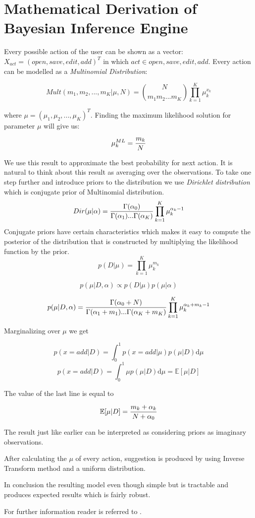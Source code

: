 \section{Mathematical Derivation of Bayesian Inference Engine}
Every possible action of the user can be shown as a vector: $X_{act}=(open, save, edit, add)^T$ in which  $act \in {open, save, edit, add}$. Every action can be modelled as a \textit{Multinomial Distribution}:

\[
Mult(m_1,m_2,...,m_K|\mu,N)={N \choose m_1 m_2 ... m_K}\prod_{k=1}^K \mu_{k}^{x_k}
\]

where $\mu=(\mu_1,\mu_2,...,\mu_K)^T$. Finding the maximum likelihood solution for parameter $\mu$ will give us:

\[
\mu_k^{ML}={m_k \over N} 
\]

We use this result to approximate the best probability for next action. It is natural to think about this result as averaging over the observations.
To take one step further and introduce priors to the distribution we use \textit{Dirichlet distribution} which is conjugate prior of Multinomial distribution.
\[
Dir(\mu|\alpha)={\Gamma(\alpha_0) \over \Gamma(\alpha_1)...\Gamma(\alpha_K)}\prod_{k=1}^K \mu_{k}^{\alpha_k -1}
\]
Conjugate priors have certain characteristics which makes it easy to compute the posterior of the distribution that is constructed by multiplying the likelihood function by the prior.  
\[
p(D|\mu)=\prod_{k=1}^K {\mu_{k}^{m_k}}\]

\[p(\mu| D,\alpha) \propto p(D|\mu)  p(\mu|\alpha)\]

\[p(\mu|D, \alpha)={\Gamma(\alpha_0+N) \over {\Gamma(\alpha_1+m_1)...\Gamma(\alpha_K+m_K)}}\prod_{k=1}^K \mu_{k}^{\alpha_k+m_k-1}\]

Marginalizing over $\mu$ we get 

\[p(x=add|D)=\int_0^1 p(x=add|\mu)p(\mu|D) \mathrm{d}\mu\]
\[p(x=add|D)=\int_0^1 \mu p(\mu|D)\mathrm{d}\mu = \mathbb{E}[\mu|D]\]

The value of the last line is equal to

\[\mathbb{E}[\mu|D]={m_k+\alpha_k \over {N+\alpha_0}} \]

The result just like earlier can be interpreted as considering priors as imaginary observations.

After calculating the $\mu$ of every action, suggestion is produced by using Inverse Transform method and a uniform distribution.

In conclusion the resulting model even though simple but is tractable and produces expected results which is fairly robust. 

For further information reader is referred to \cite{Bishop2007}. 
